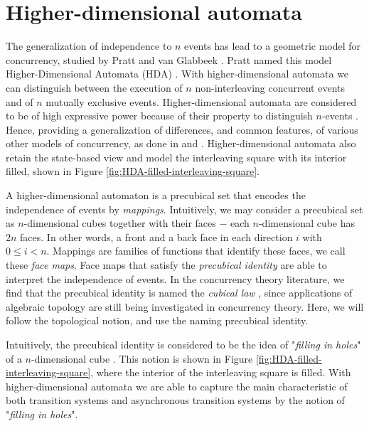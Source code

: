 \section{Higher-dimensional automata}
\label{sec:higher-dimensional-automata}

    The generalization of independence to $n$ events has lead to a geometric model for concurrency, studied by Pratt and van Glabbeek \cite{pratt91hda, Pratt00Sculptures, Glabbeek06HDA}. Pratt named this model Higher-Dimensional Automata (HDA) \cite{pratt91hda}. With higher-dimensional automata we can distinguish between the execution of $n$ non-interleaving concurrent events and of $n$ mutually exclusive events. Higher-dimensional automata are considered to be of high expressive power because of their property to distinguish $n$-events \cite{Kahl2013TheHG}. Hence, providing a generalization of differences, and common features, of various other models of concurrency, as done in \cite{Glabbeek06HDA} and \cite{Goubault18RelationshipsModelsForConcurrency}. Higher-dimensional automata also retain the state-based view and model the interleaving square with its interior filled, shown in Figure \ref{fig:HDA-filled-interleaving-square}. 
    
   A higher-dimensional automaton is a precubical set that encodes the independence of events by \emph{mappings}. Intuitively, we may consider a precubical set as $n$-dimensional cubes \cite{Fajstrup16DirectedAlgebraicTopologyConcurrency} together with their faces $-$ each $n$-dimensional cube has $2n$ faces. In other words, a front and a back face in each direction $i$ with $0 \leq i < n$. Mappings are families of functions that identify these faces, we call these \emph{face maps}. Face maps that satisfy the \emph{precubical identity} \cite{Fahrenberg05PhD, Fajstrup05DipathsInCubicalComplex, Fajstrup06AlgebraicTopologyConcurrency, Goubault2001TopologicalDeformHDA, goubault2003SomeGeometricPerspectives} are able to interpret the independence of events. In the concurrency theory literature, we find that the precubical identity is named the \emph{cubical law} \cite{Glabbeek06HDA, Johansen16STstruct}, since applications of algebraic topology are still being investigated in concurrency theory. Here, we will follow the topological notion, and use the naming precubical identity.

    Intuitively, the precubical identity is considered to be the idea of "\emph{filling in holes}" of a $n$-dimensional cube \cite[Section 2]{pratt91hda}. This notion is shown in Figure \ref{fig:HDA-filled-interleaving-square}, where the interior of the interleaving square is filled. With higher-dimensional automata we are able to capture the main characteristic of both transition systems and asynchronous transition systems by the notion of "\emph{filling in holes}".
    
